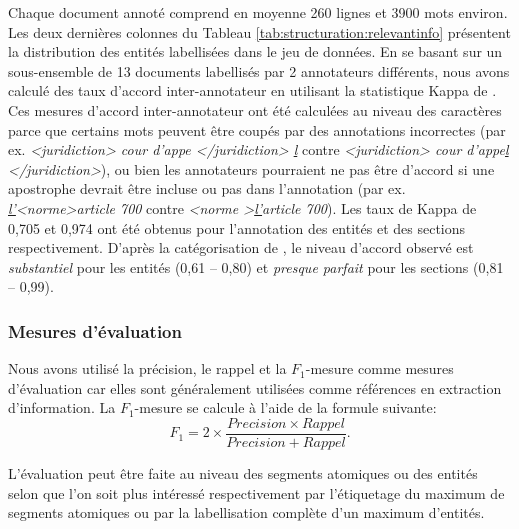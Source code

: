 Chaque document annoté comprend en moyenne 260 lignes et 3900 mots environ. Les deux dernières colonnes du Tableau \ref{tab:structuration:relevantinfo} présentent la distribution des entités labellisées dans le jeu de données. En se basant sur un sous-ensemble de 13 documents labellisés par 2 annotateurs différents, nous avons calculé des taux d'accord inter-annotateur en utilisant la statistique Kappa de \citet{cohen1960kappa}. Ces mesures d'accord inter-annotateur ont été calculées au niveau des caractères parce que certains mots peuvent être coupés par des annotations incorrectes (par ex. \textit{<juridiction> cour d'appe </juridiction> \underline{l}} contre \textit{<juridiction> cour d'appe\underline{l} </juridiction>}), ou bien les annotateurs pourraient ne pas être d'accord si une apostrophe devrait être incluse ou pas dans l'annotation (par ex. \textit{ \underline{l'}<norme>article 700} contre \textit{ <norme >\underline{l'}article 700}). Les taux de Kappa de 0,705 et 0,974 ont été obtenus pour l'annotation des entités et des sections respectivement. D'après la catégorisation de \citet{viera2005kappa}, le niveau d'accord observé est \textit{substantiel} pour les entités (0,61 -- 0,80) et \textit{presque parfait} pour les sections (0,81 -- 0,99).

\subsubsection{Mesures d'évaluation}
Nous avons utilisé la précision, le rappel et la $F_1$-mesure comme mesures d'évaluation car elles sont généralement utilisées comme références en extraction d'information. %
La $F_1$-mesure se calcule à l'aide de la formule suivante:  
\begin{equation}\label{eq:structuration:f1mesure}
F_1 = 2 \times \frac{Precision \times Rappel} {Precision + Rappel}.
\end{equation}

L'évaluation peut être faite au niveau des segments atomiques ou  des entités selon que l'on soit plus intéressé respectivement par l'étiquetage  du maximum de segments atomiques ou par la labellisation complète d'un maximum d'entités.

